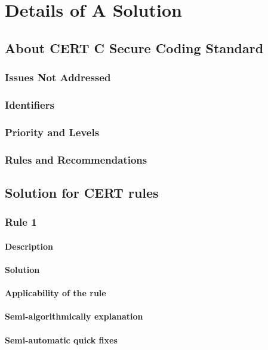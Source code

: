 \chapter{Details of A Solution}
\section{About CERT C Secure Coding Standard }
 \subsection{Issues Not Addressed}
 
 
\subsection{Identifiers}
\subsection{Priority and Levels}

\subsection{Rules and Recommendations}
 

\section{Solution for CERT rules}

\subsection{Rule 1}
\subsubsection{Description}
\subsubsection{Solution} 
\subsubsection{Applicability of the rule}
\subsubsection{Semi-algorithmically explanation}
\subsubsection{Semi-automatic quick fixes} 
 
